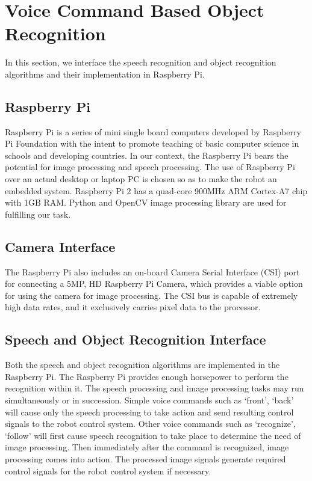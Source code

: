 \documentclass[journal,twoside]{IEEEtran}
\begin{document}
\section{Voice Command Based Object Recognition}

In this section, we interface the speech recognition and
object recognition algorithms and their implementation in
Raspberry Pi.

\subsection{Raspberry Pi}
Raspberry Pi is a series of mini single board computers
developed by Raspberry Pi Foundation with the intent to
promote teaching of basic computer science in schools and
developing countries. In our context, the Raspberry Pi bears
the potential for image processing and speech processing. The
use of Raspberry Pi over an actual desktop or laptop PC is
chosen so as to make the robot an embedded system.
Raspberry Pi 2 has a quad-core 900MHz ARM Cortex-A7
chip with 1GB RAM. Python and OpenCV image processing
library are used for fulfilling our task. \cite{Raspberry2016}

\subsection{Camera Interface}
The Raspberry Pi also includes an on-board Camera Serial
Interface (CSI) port for connecting a 5MP, HD Raspberry Pi
Camera, which provides a viable option for using the camera
for image processing. The CSI bus is capable of extremely
high data rates, and it exclusively carries pixel data to the
processor. \cite{Camera2016}

\subsection{Speech and Object Recognition Interface}

Both the speech and object recognition algorithms are
implemented in the Raspberry Pi. The Raspberry Pi provides
enough horsepower to perform the recognition within it. The
speech processing and image processing tasks may run
simultaneously or in succession. Simple voice commands such
as ‘front’, ‘back’ will cause only the speech processing to take
action and send resulting control signals to the robot control
system. Other voice commands such as ‘recognize’, ‘follow’
will first cause speech recognition to take place to determine
the need of image processing. Then immediately after the
command is recognized, image processing comes into action.
The processed image signals generate required control signals
for the robot control system if necessary.
\end{document}
